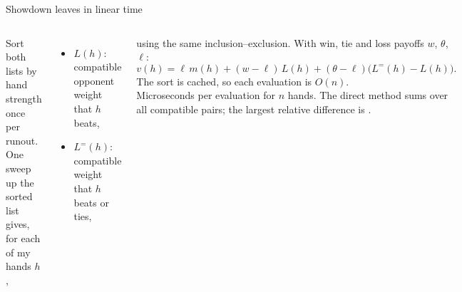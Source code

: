 \documentclass[10pt,aspectratio=169]{beamer}
\begin{document}
\begin{frame}{Showdown leaves in linear time}
\begin{columns}[T]
Sort both lists by hand strength once per runout. One sweep up the sorted list gives, for each of my hands $h$,
\begin{itemize}\setlength\itemsep{0pt}
\item $L(h)$: compatible opponent weight that $h$ beats,
\item $L^{=}(h)$: compatible weight that $h$ beats or ties,
\end{itemize}
using the same inclusion--exclusion. With win, tie and loss payoffs $w$, $\theta$, $\ell$:
\[ v(h) = \ell\, m(h) + (w-\ell)\,L(h) + (\theta-\ell)\big(L^{=}(h)-L(h)\big). \]
The sort is cached, so each evaluation is $O(n)$.
\pause
{}
\centering
{\footnotesize\setlength\tabcolsep{4pt}}\\[4pt]
{\footnotesize Microseconds per evaluation for $n$ hands. The direct method sums over all compatible pairs; the largest
relative difference is \LeafErr.}
\end{columns}
\end{frame}
\end{document}
